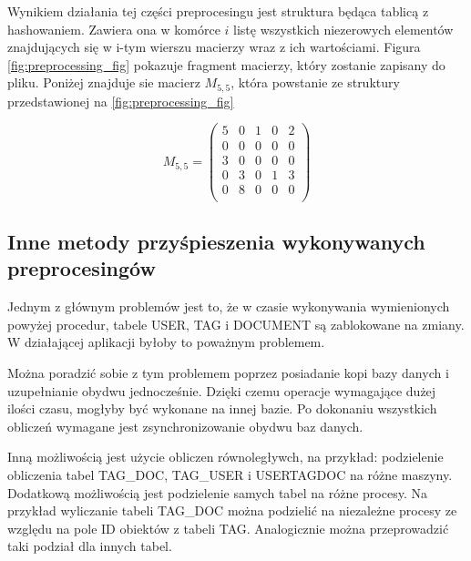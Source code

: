 Wynikiem działania tej części preprocesingu jest struktura będąca tablicą z hashowaniem. Zawiera ona w komórce $i$ listę wszystkich niezerowych elementów znajdujących się w i-tym wierszu macierzy wraz z ich wartościami. Figura \ref{fig:preprocessing_fig} pokazuje fragment macierzy, który zostanie zapisany do pliku. Poniżej znajduje sie macierz $M_{5,5}$, która powstanie ze struktury przedstawionej na \ref{fig:preprocessing_fig}


\[
 M_{5,5} =
 \begin{pmatrix}
5 & 0 & 1 & 0 & 2\\
0 & 0 & 0 & 0 & 0\\
3 & 0 & 0 & 0 & 0\\
0 & 3 & 0 & 1 & 3\\
0 & 8 & 0 & 0 & 0\\

 \end{pmatrix}
\]


\subsection{Inne metody przyśpieszenia wykonywanych preprocesingów}

Jednym z głównym problemów jest to, że w czasie wykonywania wymienionych powyżej procedur, tabele USER, TAG i DOCUMENT są zablokowane na zmiany. W działającej aplikacji byłoby to poważnym problemem.  

Można poradzić sobie z tym problemem poprzez posiadanie kopi bazy danych i uzupełnianie obydwu jednocześnie. Dzięki czemu operacje wymagające dużej ilości czasu, mogłyby być wykonane na innej bazie. Po dokonaniu wszystkich obliczeń wymagane jest zsynchronizowanie obydwu baz danych.

Inną możliwością jest użycie obliczen równoległywch, na przykład: podzielenie obliczenia tabel TAG\_DOC, TAG\_USER i USERTAGDOC na różne maszyny. Dodatkową możliwością jest podzielenie samych tabel na różne procesy. Na przykład wyliczanie tabeli TAG\_DOC można podzielić na niezależne procesy ze względu na pole ID obiektów z tabeli TAG. Analogicznie można przeprowadzić taki podział dla innych tabel.

